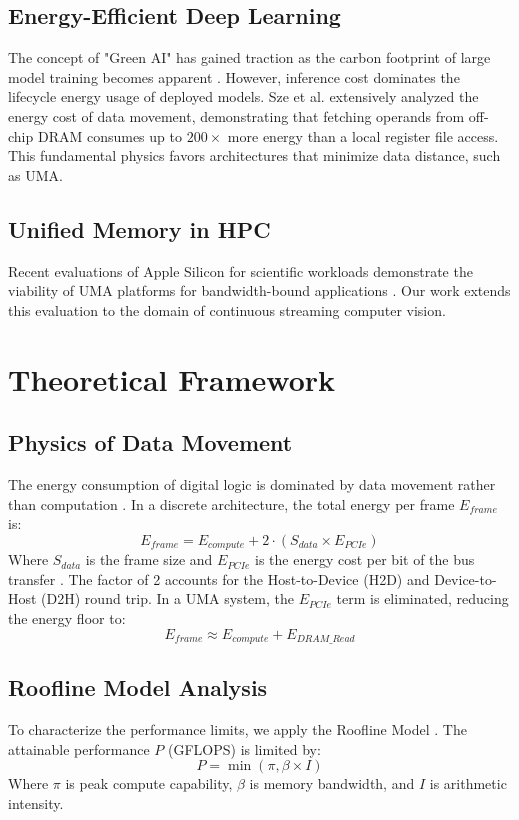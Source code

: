 \documentclass[conference]{IEEEtran}
\begin{document}
\subsection{Energy-Efficient Deep Learning}
The concept of "Green AI" has gained traction as the carbon footprint of large model training becomes apparent \cite{b12}. However, inference cost dominates the lifecycle energy usage of deployed models. Sze et al. \cite{b1} extensively analyzed the energy cost of data movement, demonstrating that fetching operands from off-chip DRAM consumes up to $200\times$ more energy than a local register file access. This fundamental physics favors architectures that minimize data distance, such as UMA.

\subsection{Unified Memory in HPC}
Recent evaluations of Apple Silicon for scientific workloads demonstrate the viability of UMA platforms for bandwidth-bound applications \cite{b6}. Our work extends this evaluation to the domain of continuous streaming computer vision.

\section{Theoretical Framework}

\subsection{Physics of Data Movement}
The energy consumption of digital logic is dominated by data movement rather than computation \cite{b8}. In a discrete architecture, the total energy per frame $E_{frame}$ is:
\begin{equation}
E_{frame} = E_{compute} + 2 \cdot (S_{data} \times E_{PCIe})
\end{equation}
Where $S_{data}$ is the frame size and $E_{PCIe}$ is the energy cost per bit of the bus transfer \cite{b8, b1}. The factor of 2 accounts for the Host-to-Device (H2D) and Device-to-Host (D2H) round trip. In a UMA system, the $E_{PCIe}$ term is eliminated, reducing the energy floor to:
\begin{equation}
E_{frame} \approx E_{compute} + E_{DRAM\_Read}
\end{equation}

\subsection{Roofline Model Analysis}
To characterize the performance limits, we apply the Roofline Model \cite{b2}. The attainable performance $P$ (GFLOPS) is limited by:
\begin{equation}
P = \min(\pi, \beta \times I)
\end{equation}
Where $\pi$ is peak compute capability, $\beta$ is memory bandwidth, and $I$ is arithmetic intensity. 
\end{document}
